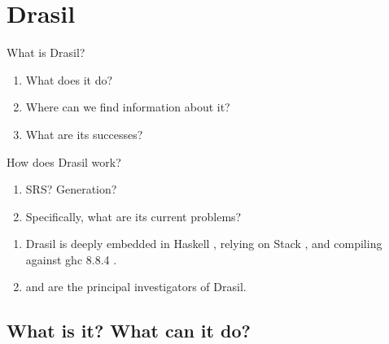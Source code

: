 \chapter{Drasil}
\label{chap:drasil}

\begin{writingdirectives}

      \item What is Drasil?
      \begin{enumerate}
            \item What does it do?
            \item Where can we find information about it?
            \item What are its successes?
      \end{enumerate}

      \item How does Drasil work?
      \begin{enumerate}
            \item SRS? Generation?
            \item Specifically, what are its current problems?
      \end{enumerate}

\end{writingdirectives}

\begin{enumerate}

      \item Drasil is deeply embedded in Haskell \cite{Haskell2010}, relying on
            Stack \cite{HaskellStack}, and compiling against \acs{ghc} 8.8.4
            \cite{GHC884}.

      \item {} and
             are the principal
            investigators of Drasil.

\end{enumerate}

\drasilLogoImg{}

\section{What is it? What can it do?}
\label{chap:drasil:sec:what-is-it}

